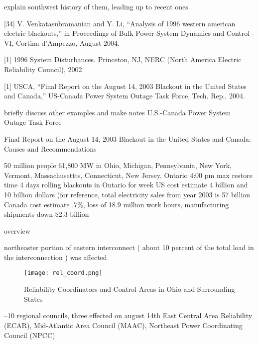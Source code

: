 explain southwest history of them, leading up to recent ones	

[34] V. Venkatasubramanian and Y. Li, “Analysis of 1996 western
american electric blackouts,” in Proceedings of Bulk Power
System Dynamics and Control - VI, Cortina d’Ampezzo, August
2004.

[1] 1996 System Disturbances. Princeton, NJ, NERC (North America
Electric Reliability Council), 2002



[1] USCA, “Final Report on the August 14, 2003 Blackout in the
United States and Canada,” US-Canada Power System Outage
Task Force, Tech. Rep., 2004.


briefly discuss other examples and  make notes
U.S.-Canada Power System Outage Task Force

Final Report on the August 14, 2003 Blackout in the United States and Canada: Causes and Recommendations

50 million people
61,800 MW in Ohio, Michigan, Pennsylvania, New York, Vermont, Massachusettts, Connecticut, New Jersey, Ontario
4:00 pm
max restore time 4 days
rolling blackouts in Ontario for week
US cost estimate 4 billion and 10 billion dollars  (for reference, total electricity sales from year 2003 is 57 billion
Canada cost estimate .7\%, loss of 18.9 million work hours, manufacturing shipments down \$2.3 billion



overview

northeaster portion of eastern interconnect ( about 10 percent of the total load in the interconnection ) was affected


\begin{figure}
\begin{center}
\texttt{[image: rel\_coord.png]}
\end{center}
\caption{Reliability Coordinators and Control Areas in Ohio and Surrounding States}
\end{figure}

--10 regional councils, three effected on august 14th
East Central Area Reliability (ECAR), Mid-Atlantic Area Council (MAAC), Northeast Power Coordinating Council (NPCC)


